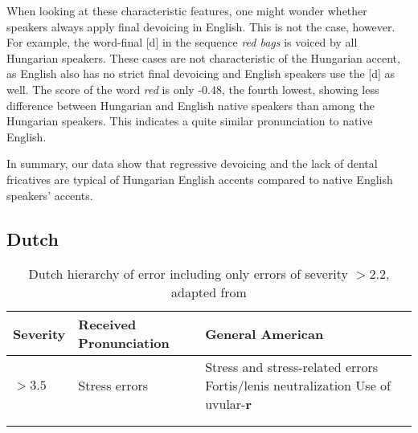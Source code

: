 \documentclass[output=paper]{LSP/langsci}
\begin{document}
When looking at these characteristic features, one might wonder whether speakers always apply final devoicing in English. This is not the case, however. For example, the word-final [d] in the sequence \textit{red bags} is voiced by all Hungarian speakers. These cases are not characteristic of the Hungarian accent, as English also has no strict final devoicing and English speakers use the [d] as well. The score of the word \textit{red} is only -0.48, the fourth lowest, showing less difference between Hungarian and English native speakers than among the Hungarian speakers. This indicates a quite similar pronunciation to native English.

In summary, our data show that regressive devoicing and the lack of dental fricatives are typical of Hungarian English accents compared to native English speakers' accents.

\subsection{Dutch}

\begin{table}[h]
\begin{tabular}{l | p{4.8cm} | p{4.8cm}}
\lsptoprule %
{Severity} & {Received Pronunciation} & {General American} \\ \midrule \midrule
{$> 3.5$} & Stress errors & Stress and stress-related errors \newline Fortis/lenis neutralization \newline Use of uvular-\textbf{r} \\ \midrule
\\ 
\lspbottomrule %
\end{tabular}
\caption{Dutch hierarchy of error including only errors of severity $> 2.2$, adapted from \citet{van_den_doel_evaluation_2006}}
\label{tb:doel}
\end{table}
\end{document}
